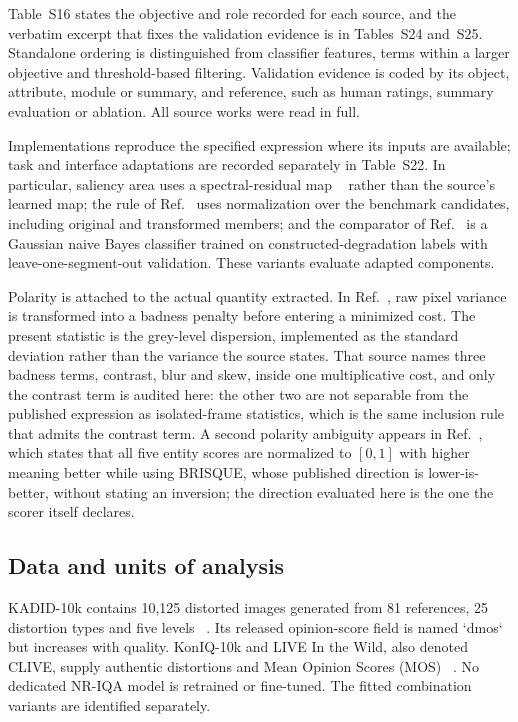 Table~S16 states the objective and role recorded for each source, and the verbatim excerpt that fixes the validation evidence is in Tables~S24 and~S25. Standalone ordering is distinguished from classifier features, terms within a larger objective and threshold-based filtering. Validation evidence is coded by its object, attribute, module or summary, and reference, such as human ratings, summary evaluation or ablation. All \fontesTrabalhos{} source works were read in full.

Implementations reproduce the specified expression where its inputs are available; task and interface adaptations are recorded separately in Table~S22. In particular, saliency area uses a spectral-residual map ~\citep{hou2007spectral} rather than the source's learned map; the rule of Ref.~\citep{korolkov2025keyframe} uses normalization over the benchmark candidates, including original and transformed members; and the comparator of Ref.~\citep{ke2006highlevel} is a Gaussian naive Bayes classifier trained on constructed-degradation labels with leave-one-segment-out validation. These variants evaluate adapted components.

Polarity is attached to the actual quantity extracted. In Ref.~\citep{jeong2016static}, raw pixel variance is transformed into a badness penalty before entering a minimized cost. The present statistic is the grey-level dispersion, implemented as the standard deviation rather than the variance the source states. That source names three badness terms, contrast, blur and skew, inside one multiplicative cost, and only the contrast term is audited here: the other two are not separable from the published expression as isolated-frame statistics, which is the same inclusion rule that admits the contrast term. A second polarity ambiguity appears in Ref.~\citep{xu2024property}, which states that all five entity scores are normalized to $[0,1]$ with higher meaning better while using BRISQUE, whose published direction is lower-is-better, without stating an inversion; the direction evaluated here is the one the scorer itself declares. 

\subsection{Data and units of analysis}\label{sec:data}

KADID-10k contains 10,125 distorted images generated from 81 references, 25 distortion types and five levels ~\citep{lin2019kadid}. Its released opinion-score field is named `dmos` but increases with quality. KonIQ-10k and LIVE In the Wild, also denoted CLIVE, supply authentic distortions and Mean Opinion Scores (MOS) ~\citep{ghadiyaram2016clive,hosu2020koniq}. No dedicated NR-IQA model is retrained or fine-tuned. The fitted combination variants are identified separately.

